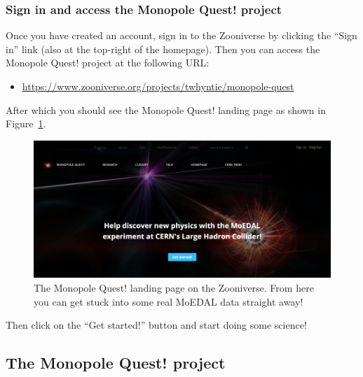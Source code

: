 \subsubsection{Sign in and access the Monopole Quest! project}
\label{sec:zooniversesignin}
Once you have created an account,
sign in to the Zooniverse by clicking the ``Sign in'' link
(also at the top-right of the homepage).
Then you can access the Monopole Quest! project at the following URL:

\begin{itemize}
\item \url{https://www.zooniverse.org/projects/twhyntie/monopole-quest}
\end{itemize}

After which you should see the Monopole Quest! landing page as
shown in Figure~\ref{fig:mqlandingpage}.

%
\begin{figure}[htbp]
  \centering
  \includegraphics[width=1.0\textwidth]{assets/images/mqlandingpage/mqlandingpage.png}
  \caption[The Monopole Quest! project landing page]
  {\label{fig:mqlandingpage}The Monopole Quest! landing page on the Zooniverse.
From here you can get stuck into some real MoEDAL data straight away!}
\end{figure}
%

Then click on the ``Get started!'' button and start doing some science!

\subsection{The Monopole Quest! project}
\label{sec:monopolequest}

